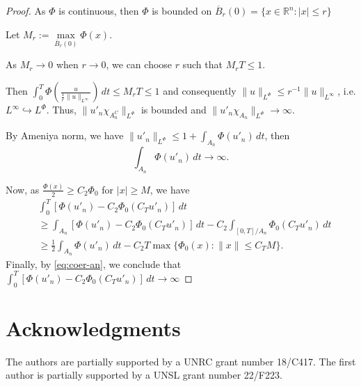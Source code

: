 \documentclass[twoside]{article}
\theoremstyle{remark}
\newcommand{\orlnor}{\|_{L^{\Phi}}}
\newcommand{\linf}{\|_{L^{\infty}}}
\newcommand{\rr}{\mathbb{R}}
\renewcommand{\leq}{\leqslant}
\renewcommand{\geq}{\geqslant}
\begin{document}
\begin{proof}
As $\Phi$ is continuous, then $\Phi$ is bounded on 
$\overline{B}_r(0)=\{x\in \rr^n:|x|\leq r\}$

Let $M_r:=\max\limits_{\overline{B}_r(0)} \Phi(x)$. 

As $M_r\to 0$ when $r\to 0$, we can choose $r$ such that $M_rT\leq 1$.

Then
$\int_0^T \Phi(\frac{u}{\frac{1}{r}\|u\linf})\,dt\leq M_rT\leq 1$ 
and consequently 
$\|u\orlnor \leq r^{-1}\|u\linf$, i.e. $L^{\infty} \hookrightarrow L^\Phi$. 
Thus, 
$\|u'_n \chi_{A_n^C}\orlnor$ is bounded and $\|u'_n\chi_{A_n}\orlnor\to \infty$.

By Ameniya norm, we have
$\|u'_n\orlnor \leq 1+\int_{A_n} \Phi(u'_n)\,dt$, then 
\begin{equation}\label{eq:coer-an}
\int_{A_n} \Phi(u'_n)\,dt\to \infty.
\end{equation}

Now, as $\frac{\Phi(x)}{2}\geq C_2\Phi_0$ for $|x|\geq M$, we have
\begin{equation}
\begin{split}
&\int_0^T [\Phi(u'_n)-C_2 \Phi_0(C_T u'_n)]\,dt
\\
&\geq
\int_{A_n} [\Phi(u'_n)-C_2 \Phi_0(C_T u'_n)]\,dt-C_2\int_{[0,T]/A_n} \Phi_0(C_Tu'_n)\,dt
\\
&\geq \frac{1}{2}\int_{A_n}\Phi(u'_n)\,dt-C_2T\max\{\Phi_0(x):\|x\|\leq C_TM\}.
\end{split}
\end{equation}
Finally, by \eqref{eq:coer-an}, we conclude that 
$\int_0^T [\Phi(u'_n)-C_2 \Phi_0(C_T u'_n)]\,dt\to \infty$

\end{proof}

\section*{Acknowledgments}
The authors are partially supported by a UNRC grant number 18/C417. The first author is  partially supported by a  UNSL grant number 22/F223. 




% 
 
 

\end{document}
